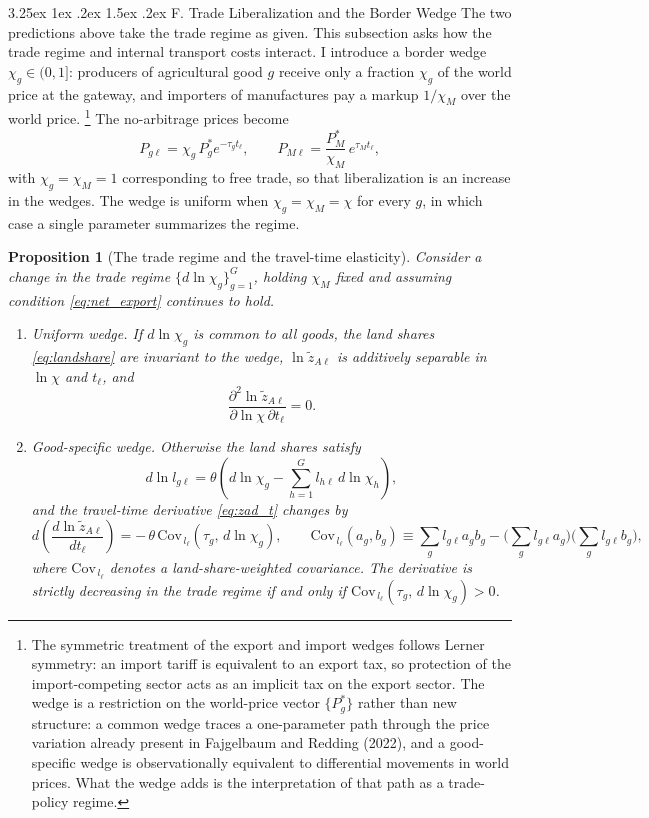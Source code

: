 \documentclass[11pt]{article}
\makeatletter
\renewcommand\paragraph{\@startsection{paragraph}{4}{\z@}%
  {3.25ex \@plus 1ex \@minus .2ex}%
  {1.5ex \@plus .2ex}%
  {\normalfont\normalsize\bfseries}}
\newtheorem{proposition}{Proposition}
\makeatother
\begin{document}
\paragraph{F. Trade Liberalization and the Border Wedge}
The two predictions above take the trade regime as given. This subsection asks how the trade regime and internal transport costs interact. I introduce a border wedge $\chi_g \in (0,1]$: producers of agricultural good $g$ receive only a fraction $\chi_g$ of the world price at the gateway, and importers of manufactures pay a markup $1/\chi_M$ over the world price. \footnote{The symmetric treatment of the export and import wedges follows Lerner symmetry: an import tariff is equivalent to an export tax, so protection of the import-competing sector acts as an implicit tax on the export sector. The wedge is a restriction on the world-price vector $\{P_g^\ast\}$ rather than new structure: a common wedge traces a one-parameter path through the price variation already present in Fajgelbaum and Redding (2022), and a good-specific wedge is observationally equivalent to differential movements in world prices. What the wedge adds is the interpretation of that path as a trade-policy regime.} The no-arbitrage prices become
\begin{equation}
P_{g\ell} = \chi_g\, P_g^\ast e^{-\tau_g t_\ell},
\qquad
P_{M\ell} = \frac{P_M^\ast}{\chi_M}\, e^{\tau_M t_\ell},
\label{eq:prices_chi}
\end{equation}
with $\chi_g=\chi_M=1$ corresponding to free trade, so that liberalization is an increase in the wedges. The wedge is uniform when $\chi_g=\chi_M=\chi$ for every $g$, in which case a single parameter summarizes the regime.

\begin{proposition}[The trade regime and the travel-time elasticity]
\label{prop:complementarity}
Consider a change in the trade regime $\{d\ln\chi_g\}_{g=1}^G$, holding $\chi_M$ fixed and assuming condition \eqref{eq:net_export} continues to hold.
\begin{enumerate}[label=(\roman*)]
\item \emph{Uniform wedge.} If $d\ln\chi_g$ is common to all goods, the land shares \eqref{eq:landshare} are invariant to the wedge, $\ln \tilde z_{A\ell}$ is additively separable in $\ln\chi$ and $t_\ell$, and
\[
\frac{\partial^2 \ln\tilde z_{A\ell}}{\partial\ln\chi\,\partial t_\ell} = 0 .
\]
\item \emph{Good-specific wedge.} Otherwise the land shares satisfy
\[
d \ln l_{g\ell} = \theta\left( d\ln\chi_g - \sum_{h=1}^G l_{h\ell}\, d\ln\chi_h \right),
\]
and the travel-time derivative \eqref{eq:zad_t} changes by
\[
d\!\left(\frac{d \ln \tilde z_{A\ell}}{d t_\ell}\right)
= -\,\theta\,\mathrm{Cov}_{\,l_\ell}\!\left(\tau_g,\, d\ln\chi_g\right),
\qquad
\mathrm{Cov}_{\,l_\ell}(a_g,b_g) \equiv \sum_{g} l_{g\ell} a_g b_g - \Big(\sum_g l_{g\ell} a_g\Big)\Big(\sum_g l_{g\ell} b_g\Big),
\]
where $\mathrm{Cov}_{\,l_\ell}$ denotes a land-share-weighted covariance. The derivative is strictly decreasing in the trade regime if and only if $\mathrm{Cov}_{\,l_\ell}(\tau_g,\, d\ln\chi_g)>0$.
\end{enumerate}
\end{proposition}
\end{document}
